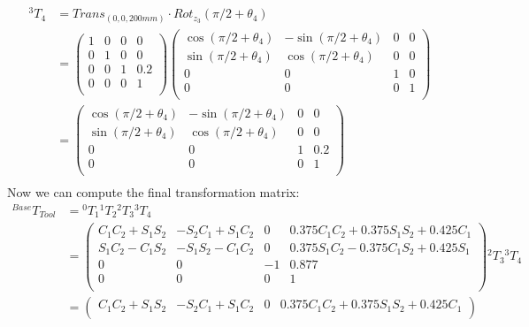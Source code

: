 \documentclass[a4paper,11pt]{article}
\begin{document}
\begin {enumerate}
\begin{enumerate}
\begin{align*}
        	{^3T_4} &= Trans_{(0,0,200mm)} \cdot Rot_{z_3}(\pi/2 + \theta_4)\\
        	&= \begin{pmatrix}
        		1 & 0 & 0 & 0\\
        		0 & 1 & 0 & 0\\
        		0 & 0 & 1 & 0.2\\
        		0 & 0 & 0 & 1\\
        	\end{pmatrix}
        	\begin{pmatrix}
        		\cos(\pi/2 + \theta_4) & -\sin(\pi/2 + \theta_4) & 0 & 0\\
        		\sin(\pi/2 + \theta_4) & \cos(\pi/2 + \theta_4) & 0 & 0\\
        		0 & 0 & 1 & 0\\
        		0 & 0 & 0 & 1\\
        	\end{pmatrix}\\
        	&= \begin{pmatrix}
        		\cos(\pi/2 + \theta_4) & -\sin(\pi/2 + \theta_4) & 0 & 0\\
        		\sin(\pi/2 + \theta_4) & \cos(\pi/2 + \theta_4) & 0 & 0\\
        		0 & 0 & 1 & 0.2\\
        		0 & 0 & 0 & 1\\
        	\end{pmatrix}\\
        \end{align*}
        Now we can compute the final transformation matrix:
        \begin{align*}
        	{^{Base}T_{Tool}} &= {^0T_1}{^1T_2}{^2T_3}{^3T_4}\\
        	&= \begin{pmatrix}
        		C_1C_2 + S_1S_2 & -S_2C_1 + S_1C_2 & 0 & 0.375C_1C_2 + 0.375S_1S_2 + 0.425C_1\\
        		S_1C_2-C_1S_2 & -S_1S_2-C_1C_2 & 0 & 0.375S_1C_2-0.375C_1S_2+0.425S_1\\
        		0 & 0 & -1 & 0.877\\
        		0 & 0 & 0 & 1\\
        	\end{pmatrix} {^2T_3}{^3T_4}\\
        	&= \begin{pmatrix}
        		C_1C_2 + S_1S_2 & -S_2C_1 + S_1C_2 & 0 & 0.375C_1C_2 + 0.375S_1S_2 + 0.425C_1\\

\end{pmatrix}
\end{align*}
\end{enumerate}
\end{enumerate}
\end{document}
